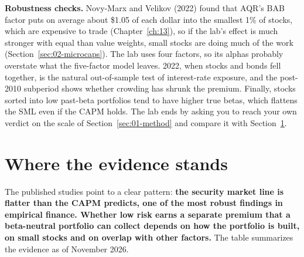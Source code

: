 \label{sec:18-stress}
\textbf{Robustness checks.} Novy-Marx and Velikov (2022) found that AQR's BAB factor puts on average about \$1.05 of each dollar into the smallest 1\% of stocks, which are expensive to trade (Chapter~\ref{ch:13}), so if the lab's effect is much stronger with equal than value weights, small stocks are doing much of the work (Section~\ref{sec:02-microcaps}). The lab uses four factors, so its alphas probably overstate what the five-factor model leaves. 2022, when stocks and bonds fell together, is the natural out-of-sample test of interest-rate exposure, and the post-2010 subperiod shows whether crowding has shrunk the premium. Finally, stocks sorted into low past-beta portfolios tend to have higher true betas, which flattens the SML even if the CAPM holds. The lab ends by asking you to reach your own verdict on the scale of Section~\ref{sec:01-method} and compare it with Section~\ref{sec:18-verdict}.

\section{Where the evidence stands}
\label{sec:18-verdict}

The published studies point to a clear pattern: \textbf{the security market line is flatter than the CAPM predicts, one of the most robust findings in empirical finance. Whether low risk earns a separate premium that a beta-neutral portfolio can collect depends on how the portfolio is built, on small stocks and on overlap with other factors.} The table summarizes the evidence as of November 2026.

